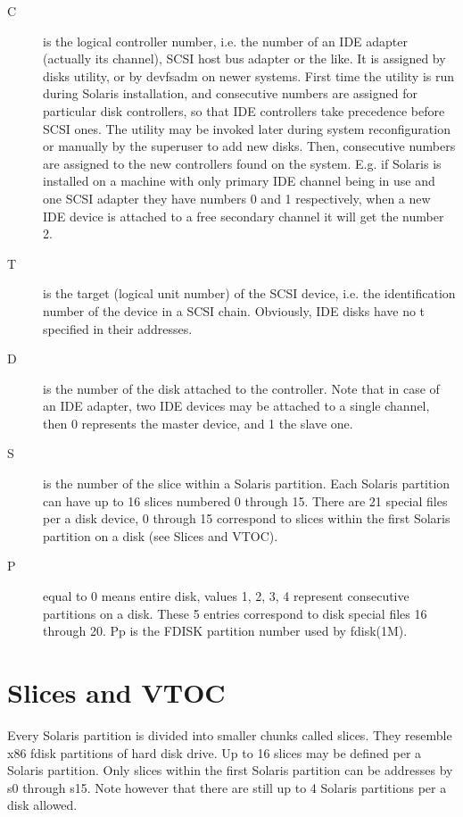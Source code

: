 \documentclass{article}
\begin{document}
\begin{description}

\item[C] is the logical controller number, i.e. the number of an IDE adapter
(actually its channel), SCSI host bus adapter or the like. It is assigned by
disks utility, or by devfsadm on newer systems. First time the utility is run
during Solaris installation, and consecutive numbers are assigned for particular
disk controllers, so that IDE controllers take precedence before SCSI ones. The
utility may be invoked later during system reconfiguration or manually by the
superuser to add new disks. Then, consecutive numbers are assigned to the new
controllers found on the system. E.g. if Solaris is installed on a machine with
only primary IDE channel being in use and one SCSI adapter they have numbers 0
and 1 respectively, when a new IDE device is attached to a free secondary
channel it will get the number 2.

\item[T] is the target (logical unit number) of the SCSI device, i.e. the
identification number of the device in a SCSI chain. Obviously, IDE disks have
no t specified in their addresses.

\item[D] is the number of the disk attached to the controller. Note that in case of an
IDE adapter, two IDE devices may be attached to a single channel, then 0
represents the master device, and 1 the slave one.

\item[S] is the number of the slice within a Solaris partition. Each Solaris partition
can have up to 16 slices numbered 0 through 15. There are 21 special files per a
disk device, 0 through 15 correspond to slices within the first Solaris
partition on a disk (see Slices and VTOC).

\item[P] equal to 0 means entire disk, values 1, 2, 3, 4 represent consecutive
partitions on a disk. These 5 entries correspond to disk special files 16
through 20. Pp is the FDISK partition number used by fdisk(1M).

\end{description}

\section*{Slices and VTOC}

Every Solaris partition is divided into smaller chunks called slices. They
resemble x86 fdisk partitions of hard disk drive. Up to 16 slices may be defined
per a Solaris partition. Only slices within the first Solaris partition can be
addresses by s0 through s15. Note however that there are still up to 4 Solaris
partitions per a disk allowed.
\end{document}
